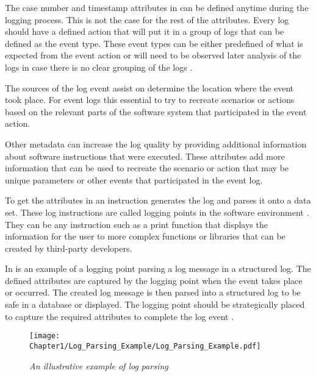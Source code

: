 The case number and timestamp attributes in  can be defined anytime during the logging process. This is not the case for the rest of the attributes. Every log should have a defined action that will put it in a group of logs that can be defined as the event type. These event types can be either predefined of what is expected from the event action or will need to be observed later analysis of the logs in case there is no clear grouping of the logs \cite{Bekeneva2020, Fedaghi2010}.\par The sources of the log event assist on determine the location where the event took place. For event logs this essential to try to recreate scenarios or actions based on the relevant parts of the software system that participated in the event action.\par Other metadata can increase the log quality by providing additional information about software instructions that were executed. These attributes add more information that can be used to recreate the scenario or action that may be unique parameters or other events that participated in the event log.\par To get the attributes in  an instruction generates the log and parses it onto a data set. These log instructions are called logging points in the software environment \cite{Pecchia2015, Zhu2015}. They can be any instruction such as a print function that displays the information for the user to more complex functions or libraries that can be created by third-party developers.

In  is an example of a logging point parsing a log message in a structured log. The defined attributes are captured by the logging point when the event takes place or occurred. The created log message is then parsed into a structured log to be safe in a database or displayed. The logging point should be strategically placed to capture the required attributes to complete the log event \cite{Fedaghi2010}.

\begin{figure}[!htb] %
	\centering %
	\texttt{[image: Chapter1/Log\_Parsing\_Example/Log\_Parsing\_Example.pdf]}
	\caption[An illustrative example of log parsing]
	{\textit{An illustrative example of log parsing \cite{Zhu2019}}} \label{fig:ch1_logParsing}
\end{figure}

